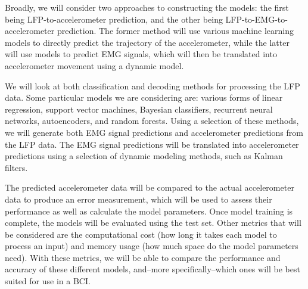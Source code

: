 \documentclass[12pt]{article}
\begin{document}
Broadly, we will consider two approaches to constructing the models: the first being LFP-to-accelerometer prediction, and the other being LFP-to-EMG-to-accelerometer prediction. The former method will use various machine learning models to directly predict the trajectory of the accelerometer, while the latter will use models to predict EMG signals, which will then be translated into accelerometer movement using a dynamic model.

We will look at both classification and decoding methods for processing the LFP data. Some particular models we are considering are: various forms of linear regression, support vector machines, Bayesian classifiers, recurrent neural networks, autoencoders, and random forests. Using a selection of these methods, we will generate both EMG signal predictions and accelerometer predictions from the LFP data. The EMG signal predictions will be translated into accelerometer predictions using a selection of dynamic modeling methods, such as Kalman filters.

The predicted accelerometer data will be compared to the actual accelerometer data to produce an error measurement, which will be used to assess their performance as well as calculate the model parameters. Once model training is complete, the models will be evaluated using the test set. Other metrics that will be considered are the computational cost (how long it takes each model to process an input) and memory usage (how much space do the model parameters need). With these metrics, we will be able to compare the performance and accuracy of these different models, and--more specifically--which ones will be best suited for use in a BCI.
\end{document}
